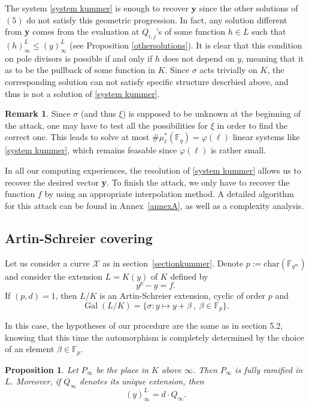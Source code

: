 \documentclass[10pt]{article}
\newtheorem{prop1}[thm]{Proposition}
\theoremstyle{definition}
\newtheorem{rq1}[thm]{Remark}
\theoremstyle{definition}
\theoremstyle{definition}
\newcommand{\cd}{\cdot}
\newcommand{\Fqm}{\mathbb{F}_{q^m}}
\newcommand{\Fq}{\mathbb{F}_q}
\newcommand{\X}{\mathcal{X}}
\newcommand{\Gal}{\operatorname{Gal}}
\begin{document}
The system \eqref{system kummer} is enough to recover $\mathbf{y}$ since the other solutions of $(5)$ do not satisfy this geometric progression. In fact, any 
solution different from \textbf{y} comes from the evaluation at $Q_{i,j}$'s of some function $h \in L$ such that $(h)^L_{\infty} \leq (y)^L_{\infty}$ (see Proposition \ref{othersolutions}). It is clear that this condition on pole divisors is possible if and only if $h$ does not depend on $y$, meaning that it as to be the pullback of some function in $K$. Since $\sigma$ acts trivially on $K$, the corresponding solution can not satisfy specific structure descrbied above, and thus is not a solution of \eqref{system kummer}.

\begin{rq1} Since $\sigma$ (and thus $\xi$) is supposed to be unknown at the beginning of the attack, one may have to test all the possibilities for $\xi$ in order to find the correct one. This leads to solve at most $\#\mu^*_{\ell}(\Fq) = \varphi(\ell)$ linear systems like \eqref{system kummer}, which remains feasable since $\varphi(\ell)$ is rather small.
\end{rq1}

In all our computing experiences, the resolution of \eqref{system kummer} allows us to recover the desired vector \textbf{y}. To finish the attack, we only have to recover the function $f$ by using an appropriate interpolation method. A detailed algorithm for this attack can be found in Annex~\ref{annexA}, as well as a complexity analysis.

\subsection{Artin-Schreier covering} \label{sectionas}

Let us consider a curve $\X$ as in section~\ref{sectionkummer}. Denote $p:=\mathrm{char}(\Fqm)$ and consider the extension $L=K(y)$ of $K$ defined by
\[y^p-y = f.\]
If $(p,d)=1$, then $L/K$ is an Artin-Schreier extension, cyclic of order $p$ and 
\[\Gal(L/K) = \{ \sigma : y \mapsto y + \beta \ , \ \beta \in \mathbb{F}_p\}.\]

In this case, the hypotheses of our procedure are the same as in section 5.2, knowing that this time the automorphism is completely determined by the choice of an element $\beta \in \mathbb{F}_p$.

\begin{prop1} \label{prop:div_pol_artin_schreier}
Let $P_{\infty}$ be the place in $K$ above $\infty$. Then $P_{\infty}$ is fully ramified in $L$. Moreover, if $Q_{\infty}$ denotes its unique extension, then
\[(y)^L_{\infty} = d \cd Q_{\infty}.\] 
\end{prop1}
\end{document}
